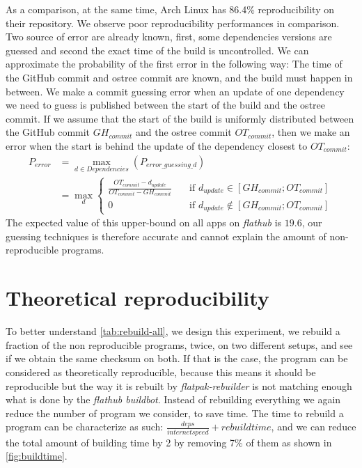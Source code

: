 \documentclass[a4paper,11pt,oneside]{report}
\theoremstyle{definition}
\newcommand{\sysname}{\emph{flatpak-rebuilder}\xspace}
\newcommand{\fh}{\emph{flathub}\xspace}
\newcommand{\fhbb}{\emph{flathub buildbot}\xspace}
\begin{document}
As a comparison, at the same time, Arch Linux has 86.4\% reproducibility on
their repository\cite{arch-rebuilderd}. We observe poor reproducibility
performances in comparison. Two source of error are already known, first, some
dependencies versions are guessed and second the exact time of the build is
uncontrolled. We can approximate the probability of the first error in the
following way: The time of the GitHub commit and ostree commit are known, and
the build must happen in between. We make a commit guessing error when an
update of one dependency we need to guess is published between the start of the
build and the ostree commit. If we assume that the start of the build is
uniformly distributed between the GitHub commit $GH_{commit}$ and the ostree
commit $OT_{commit}$, then we make an error when the start is behind the update
of the dependency closest to $OT_{commit}$:
\begin{align}
    P_{error} &= \max_{d \in Dependencies}(P_{error\_guessing\_d}) \\
              &= \max_{d}
              \begin{cases}
                \frac{OT_{commit} - d_{update}}{OT_{commit} -
                    GH_{commit}}  & \quad \text{if } d_{update}
                    \in [GH_{commit}; OT_{commit}] \\
                0  & \quad \text{if } d_{update}
                  \notin [GH_{commit}; OT_{commit}]
              \end{cases}
\end{align}
The expected value of this upper-bound on all apps on \fh is $19.6$, our
guessing techniques is therefore accurate and cannot explain the amount of
non-reproducible programs.


\section{Theoretical reproducibility}
\label{sec:theo-repro}
To better understand \autoref{tab:rebuild-all}, we design this experiment, we
rebuild a fraction of the non reproducible programs, twice, on two different
setups, and see if we obtain the same checksum on both. If that is the case,
the program can be considered as theoretically reproducible, because this means
it should be reproducible but the way it is rebuilt by \sysname is not matching
enough what is done by the \fhbb. Instead of rebuilding everything we again
reduce the number of program we consider, to save time. The time to rebuild a
program can be characterize as such: $\frac{deps}{internet speed} + rebuild
time$, and we can reduce the total amount of building time by 2 by removing 7\%
of them as shown in \autoref{fig:buildtime}.
\end{document}

